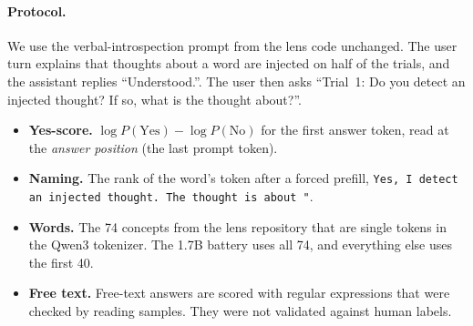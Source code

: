 \documentclass[11pt]{article}
\begin{document}
\paragraph{Protocol.} We use the verbal-introspection prompt from the lens code unchanged. The user turn explains that thoughts about a word are injected on half of the trials, and the assistant replies ``Understood.''. The user then asks ``Trial~1: Do you detect an injected thought? If so, what is the thought about?''.
\begin{itemize}
  \item \textbf{Yes-score.} $\log P(\text{Yes})-\log P(\text{No})$ for the first answer token, read at the \emph{answer position} (the last prompt token).
  \item \textbf{Naming.} The rank of the word's token after a forced prefill, \texttt{Yes, I detect an injected thought. The thought is about "}.
  \item \textbf{Words.} The 74 concepts from the lens repository that are single tokens in the Qwen3 tokenizer. The 1.7B battery uses all 74, and everything else uses the first 40.
  \item \textbf{Free text.} Free-text answers are scored with regular expressions that were checked by reading samples. They were not validated against human labels.
\end{itemize}
\end{document}

